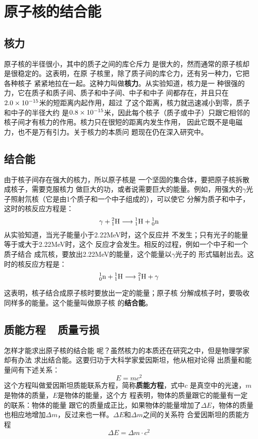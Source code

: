 \section{原子核的结合能}
\subsection{核力} 

原子核的半径很小，其中的质子之间的库仑斥力
是很大的，然而通常的原子核却是很稳定的。这表明，在原
子核里，除了质子间的库仑力，还有另一种力，它把各种核子
紧紧地拉在一起。这种力叫做\textbf{核力}。从实验知道，核力是一
种很强的力，它在质子和质子间、质子和中子间、中子和中子
间都存在，并且只在$2.0\x10^{-15}$米的短距离内起作用，超过
了这个距离，核力就迅速减小到零，质子和中子的半径大约
是$0.8\x10^{-15}$米，因此每个核子（质子或中子）只跟它相邻的
核子间才有核力的作用。核力只在很短的距离内发生作用，
因此它既不是电磁力，也不是万有引力。关于核力的本质问
题现在仍在深入研究中。

\subsection{结合能}

由于核子间存在强大的核力，所以原子核是
一个坚固的集合体，要把原子核拆散成核子，需要克服核力
做巨大的功，或者说需要巨大的能量。例如，用强大的$\gamma$光
子照射氘核（它是由1个质子和一个中子组成的），可以使它
分解为质子和中子，这时的核反应方程是：
\[\gamma +\atom{H}{2}{1}\longrightarrow \atom{H}{1}{1}+\atom{n}{1}{0} \]
从实验知道，当光子能量小于2.22MeV时，这个反应并
不发生；只有光子的能量等于或大于2.22MeV时，这个
反应才会发生。相反的过程，例如一个中子和一个质子结合
成氘核，要放出2.22MeV的能量，这个能量以$\gamma$光子的
形式辐射出去。这时的核反应方程是：
\[\atom{n}{1}{0}+ \atom{H}{1}{1}\longrightarrow \atom{H}{2}{1} +\gamma  \]

这表明，核子结合成原子核时要放出一定的能量；原子核
分解成核子时，要吸收同样多的能量。这个能量叫做原子核
的\textbf{结合能}。

\subsection{质能方程~~质量亏损}

怎样才能求出原子核的结合能
呢？虽然核力的本质还在研究之中，但是物理学家却有办法
求出结合能。这要归功于大科学家爱因斯坦，他从相对论得
出质量和能量间有下述关系：
\[E=mc^2\]
这个方程叫做爱因斯坦质能联系方程，简称\textbf{质能方程}，式中$c$
是真空中的光速，$m$是物体的质量，$E$是物体的能量，这个方
程表明，物体的质量跟它的能量有一定的联系：物体的能量
跟它的质量成正比，如果物体的能量增加了$\Delta E$，物体的质量
也相应地增加$\Delta m$，反过来也一样。$\Delta E$和$\Delta m$之间的关系符
合爱因斯坦的质能方程
\[\Delta E=\Delta m\cdot c^2\]

